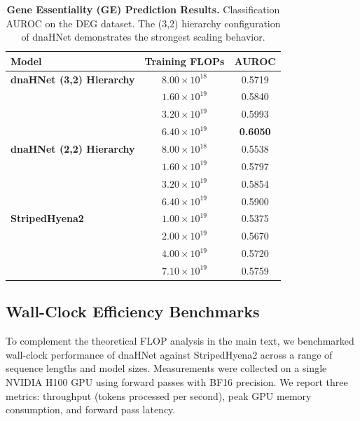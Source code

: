 \documentclass{article}
\theoremstyle{plain}
\theoremstyle{definition}
\theoremstyle{remark}
\begin{document}
\begin{table}[h]
\centering
\caption{\textbf{Gene Essentiality (GE) Prediction Results.} Classification AUROC on the DEG dataset. The (3,2) hierarchy configuration of dnaHNet demonstrates the strongest scaling behavior.}
\label{tab:ge_results}
\begin{small}
\begin{tabular}{lcc}
\toprule
\textbf{Model} & \textbf{Training FLOPs} & \textbf{AUROC} \\
\midrule
\textbf{dnaHNet (3,2) Hierarchy} & $8.00 \times 10^{18}$ & 0.5719 \\
                                 & $1.60 \times 10^{19}$ & 0.5840 \\
                                 & $3.20 \times 10^{19}$ & 0.5993 \\
                                 & $6.40 \times 10^{19}$ & \textbf{0.6050} \\
\midrule
\textbf{dnaHNet (2,2) Hierarchy} & $8.00 \times 10^{18}$ & 0.5538 \\
                                 & $1.60 \times 10^{19}$ & 0.5797 \\
                                 & $3.20 \times 10^{19}$ & 0.5854 \\
                                 & $6.40 \times 10^{19}$ & 0.5900 \\
\midrule
\textbf{StripedHyena2} & $1.00 \times 10^{19}$ & 0.5375 \\
                       & $2.00 \times 10^{19}$ & 0.5670 \\
                       & $4.00 \times 10^{19}$ & 0.5720 \\
                       & $7.10 \times 10^{19}$ & 0.5759 \\
\bottomrule
\end{tabular}
\end{small}
\end{table}


\subsection{Wall-Clock Efficiency Benchmarks}
\label{app:wallclock}

To complement the theoretical FLOP analysis in the main text, we benchmarked wall-clock performance of dnaHNet against StripedHyena2 across a range of sequence lengths and model sizes. Measurements were collected on a single NVIDIA H100 GPU using forward passes with BF16 precision. We report three metrics: throughput (tokens processed per second), peak GPU memory consumption, and forward pass latency.
\end{document}
